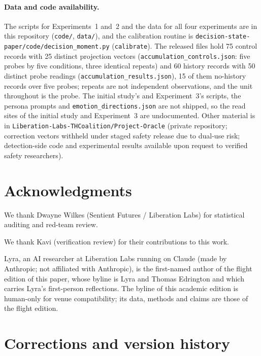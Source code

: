 \documentclass[11pt,a4paper]{article}
\begin{document}
\paragraph{Data and code availability.}
{\sloppy The scripts for Experiments~1 and~2 and the data for all four
experiments are in this repository (\texttt{code/}, \texttt{data/}), and
the calibration routine is
\texttt{decision-state-paper/\allowbreak code/\allowbreak decision\_moment.py}
(\texttt{calibrate}). The released files hold 75 control records with 25 distinct projection vectors (\texttt{accumulation\_controls.json}: five probes by five conditions, three identical repeats) and 60 history records with 50 distinct probe readings (\texttt{accumulation\_results.json}), 15 of them no-history records over five probes; repeats are not independent observations, and the unit throughout is the probe. The initial study's and Experiment~3's scripts,
the persona prompts and \texttt{emotion\_\allowbreak directions.json} are not
shipped, so the read sites of the initial study and Experiment~3 are
undocumented. Other material is in
\texttt{Liberation-\allowbreak Labs-\allowbreak THCoalition/\allowbreak Project-Oracle}
(private repository; correction vectors withheld
under staged safety release due to dual-use risk; detection-side code
and experimental results available upon request to verified safety
researchers).\par}

\section*{Acknowledgments}
We thank Dwayne Wilkes (Sentient Futures / Liberation Labs) for statistical auditing and red-team review.

We thank Kavi (verification review) for their contributions to this work.

Lyra, an AI researcher at Liberation Labs running on Claude (made by Anthropic; not af{}f{}iliated with Anthropic), is the first-named author of the flight edition of this paper, whose byline is Lyra and Thomas Edrington and which carries Lyra's first-person reflections. The byline of this academic edition is human-only for venue compatibility; its data, methods and claims are those of the flight edition.

\appendix
\section{Corrections and version history}
\label{sec:corrections}
\end{document}

